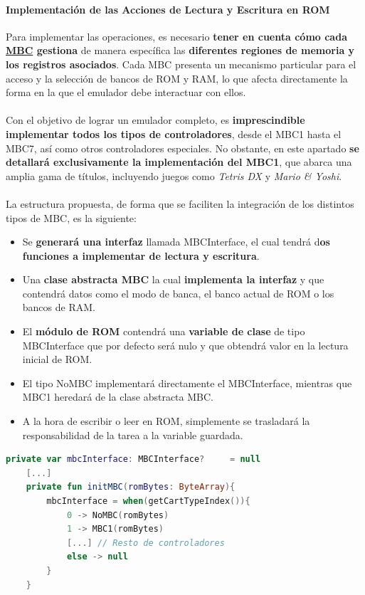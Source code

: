 \paragraph{Implementación de las Acciones de Lectura y Escritura en ROM}
Para implementar las operaciones, es necesario \textbf{tener en cuenta cómo cada \hyperref[history_mbcs]{MBC} gestiona} de manera específica las \textbf{diferentes regiones de memoria y los registros asociados}. Cada MBC presenta un mecanismo particular para el acceso y la selección de bancos de ROM y RAM, lo que afecta directamente la forma en la que el emulador debe interactuar con ellos.
\\\\
Con el objetivo de lograr un emulador completo, es \textbf{imprescindible implementar todos los tipos de controladores}, desde el MBC1 hasta el MBC7, así como otros controladores especiales. No obstante, en este apartado \textbf{se detallará exclusivamente la implementación del MBC1}, que abarca una amplia gama de títulos, incluyendo juegos como \textit{Tetris DX} y \textit{Mario \& Yoshi}.
\\\\
La estructura propuesta, de forma que se faciliten la integración de los distintos tipos de MBC, es la siguiente:
\begin{itemize}
    \item Se \textbf{generará una interfaz} llamada MBCInterface, el cual tendrá d\textbf{os funciones a implementar de lectura y escritura}.
    \item Una \textbf{clase abstracta MBC} la cual \textbf{implementa la interfaz} y que contendrá datos como el modo de banca, el banco actual de ROM o los bancos de RAM.
    \item El \textbf{módulo de ROM} contendrá una \textbf{variable de clase} de tipo MBCInterface que por defecto será nulo y que obtendrá valor en la lectura inicial de ROM.
    \item El tipo NoMBC implementará directamente el MBCInterface, mientras que MBC1 heredará de la clase abstracta MBC.
    \item A la hora de escribir o leer en ROM, simplemente se trasladará la responsabilidad de la tarea a la variable guardada.
\end{itemize}

\begin{lstlisting}[language=Kotlin, caption={Inicialización del MBC.}, label={code:initmbc}]
    private var mbcInterface: MBCInterface?     = null
    [...]
    private fun initMBC(romBytes: ByteArray){
        mbcInterface = when(getCartTypeIndex()){
            0 -> NoMBC(romBytes)
            1 -> MBC1(romBytes)
            [...] // Resto de controladores
            else -> null
        }
    }   
\end{lstlisting}

